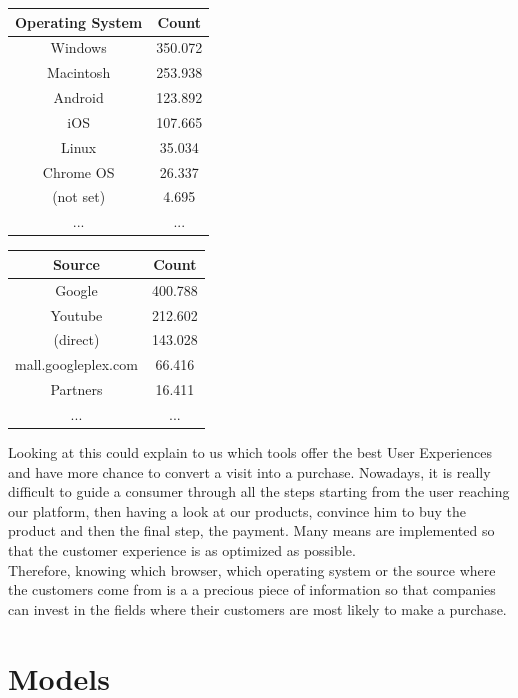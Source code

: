 \documentclass[a4paper, 12pt, one column]{article}
\begin{document}
\begin{center}
\begin{tabular}{ |c|c| } 
 \hline
 \textbf{Operating System} & \textbf{Count} \\ 
 \hline
Windows & 350.072\\
Macintosh & 253.938\\
Android & 123.892 \\
iOS & 107.665 \\
Linux & 35.034 \\
Chrome OS & 26.337 \\
(not set) & 4.695 \\
... & ... \\ 
 \hline
\end{tabular}
\end{center}

\begin{center}
\begin{tabular}{ |c|c| } 
 \hline
 \textbf{Source} & \textbf{Count} \\ 
 \hline
Google & 400.788\\
Youtube & 212.602\\
(direct) & 143.028 \\
mall.googleplex.com & 66.416 \\
Partners & 16.411 \\
... & ... \\ 
 \hline
\end{tabular}
\end{center}

Looking at this could explain to us which tools offer the best User Experiences and have more chance to convert a visit into a purchase. Nowadays, it is really difficult to guide a consumer through all the steps starting from the user reaching our platform, then having a look at our products, convince him to buy the product and then the final step, the payment. Many means are implemented so that the customer experience is as optimized as possible. \\

Therefore, knowing which browser, which operating system or the source where the customers come from is a a precious piece of information so that companies can invest in the fields where their customers are most likely to make a purchase.

\newpage

\section{Models}
\end{document}

